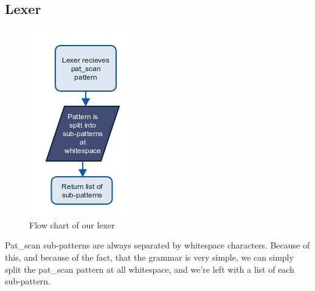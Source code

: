 \documentclass[12pt]{article}
\begin{document}
\subsection{Lexer}
\begin{figure}[H]
	\begin{center}
		\includegraphics[scale=1]{lexer.png}
	\end{center}
	\caption{Flow chart of our lexer}
\end{figure}

Pat\_scan sub-patterns are always separated by whitespace characters. Because of this, and because of the fact, that the grammar is very simple, we can simply split the pat\_scan pattern at all whitespace, and we're left with a list of each sub-pattern.
\end{document}
